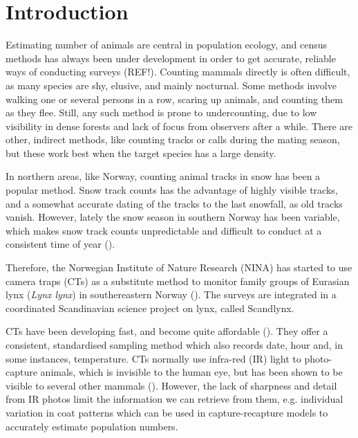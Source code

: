 \chapter{Introduction}
%
Estimating number of animals are central in population ecology, and census methods has always been under development in order to get accurate, reliable ways of conducting surveys (REF!). %
Counting mammals directly is often difficult, as many species are shy, elusive, and mainly nocturnal.
Some methods involve walking one or several persons in a row, scaring up animals, and counting them as they flee.
Still, any such method is prone to undercounting, due to low visibility in dense forests and lack of focus from observers after a while.
There are other, indirect methods, like counting tracks or calls during the mating season, but these work best when the target species has a large density. %

In northern areas, like Norway, counting animal tracks in snow has been a popular method. %
Snow track counts has the advantage of highly visible tracks, and a somewhat accurate dating of the tracks to the last snowfall, as old tracks vanish.
However, lately the snow season in southern Norway has been variable, which makes snow track counts unpredictable and difficult to conduct at a consistent time of year (\cite{Odden2015}).

Therefore, the Norwegian Institute of Nature Research (NINA) has started to use camera traps %
(CTs) as a substitute method to monitor family groups of Eurasian lynx (\textit{Lynx lynx}) in southereastern Norway  (\cite{Odden2015}). The surveys are integrated in a coordinated Scandinavian science project on lynx, called Scandlynx. %

CTs have been developing fast, and become quite affordable (\cite{Burton2015}).
They offer a consistent, standardised sampling method which also records date, hour and, in some instances, temperature.
CTs normally use infra-red (IR) light to photo-capture animals, which is invisible to the human eye, but has been shown to be visible to several other mammals (\cite{Meek2014}).
However, the lack of sharpness and detail from IR photos limit the information we can retrieve from them, e.g. individual variation in coat patterns which can be used in capture-recapture models to accurately estimate population numbers. 

